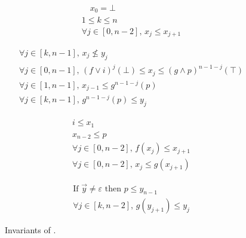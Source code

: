 \begin{figure}[t]
	\begin{minipage}{.35\linewidth}
		\small
		\begin{align}
			\quad x_0 = \bot \tag{I0}\label{eq:pdr:x0bot} \\
			1\leq k \leq n \tag{I1} \label{eq:pdr:invi}   \\
			\forall j\in[0, n-2]\text{, }x_j \le x_{j+1} \tag{I2}\label{eq:pdr:positivechain}
		\end{align}
	\end{minipage}%
	\begin{minipage}{.65\linewidth}
		\small
		\begin{align}
			\forall j \in [k, n - 1] \text{, } x_j \not\le y_j \tag{PN} \label{eq:pdr:positivenegative}                                              \\
			\forall j \in [0, n-1] \text{, } (f \lor i)^j (\bot) \le x_j \le (g \land p)^{n-1-j} (\top) \tag{A1} \label{eq:pdr:positiveinitialfinal} \\
			\forall j \in [1, n-1] \text{, } x_{j-1} \le g^{n-1-j}(p) \tag{A2} \label{eq:pdr:positivefinal}                                          \\
			\forall j\in[k,n-1]\text{, }g^{n-1-j}(p) \le y_j \tag{A3} \label{eq:pdr:negativefinal}
		\end{align}
	\end{minipage}
	\begin{minipage}{.4\linewidth}
		\small
		\begin{align}
			i \le x_1 \tag{P1} \label{eq:pdr:Ix1}                                            \\
			x_{n-2} \le p \tag{P2}\label{eq:pdr:xP}                                          \\
			\forall j\in[0, n-2]\text{, }f(x_j) \le x_{j+1} \tag{P3}\label{eq:pdr:positiveF} \\
			\forall j\in[0, n-2]\text{, }x_j \le g(x_{j+1}) \tag{P3a} \label{eq:pdr:positiveG}
		\end{align}
	\end{minipage}%
	\begin{minipage}{.6\linewidth}
		\small
		\begin{align}
			\text{If }\vec{y}\neq \varepsilon\text{ then }p \le y_{n-1} \tag{N1}\label{eq:pdr:Pepsilon} \\
			\forall j\in[k,n-2]\text{, }g(y_{j+1}) \le y_j \tag{N2}\label{eq:pdr:negativeG}
		\end{align}
	\end{minipage}

	\vspace*{0.5em}
	\caption{Invariants of {\APDR}.}
	\label{fig:pdr:invariants}
\end{figure}

